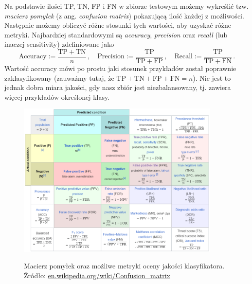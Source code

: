 \documentclass{myclass}
\numberwithin{equation}{subsection}
\begin{document}
Na podstawie ilości TP, TN, FP i FN w zbiorze testowym możemy wykreślić tzw. \emph{macierz pomyłek}
(z ang. \textit{confusion matrix}) pokazującą ilość każdej z możliwości. Następnie możemy obliczyć
różne stosunki tych wartości, aby uzyskać różne metryki. Najbardziej standardowymi są
\emph{accuracy}, \emph{precision} oraz \emph{recall} (lub inaczej sensitivity) zdefiniowane jako
\[
\mathrm{Accuracy} := \frac{\mathrm{TP} + \mathrm{TN}}{n}\,,\quad\mathrm{Precision} := \frac{\mathrm{TP}}{\mathrm{TP} + \mathrm{FP}}\,,\quad\mathrm{Recall} := \frac{\mathrm{TP}}{\mathrm{TP} + \mathrm{FN}}\,.
\]
Wartość accuracy mówi po prostu jaki stosunek przykładów został poprawnie zaklasyfikowany (zauważmy
tutaj, że \(\mathrm{TP + TN + FP + FN} = n\)). Nie jest to jednak dobra miara jakości, gdy nasz
zbiór jest niezbalansowany, tj. zawiera więcej przykładów określonej klasy.

\begin{figure}[ht]
\centering
\includegraphics[width=0.9\textwidth]{figs/confmat.png}
\label{fig:confusionMatrix}
\caption{Macierz pomyłek oraz możliwe metryki oceny jakości klasyfikatora. Źródło:
\href{https://en.wikipedia.org/wiki/Confusion_matrix}{en.wikipedia.org/wiki/Confusion\_matrix}}
\end{figure}
\end{document}
